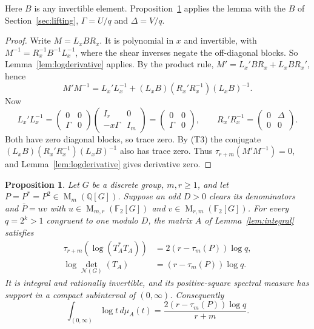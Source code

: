 \documentclass[11pt]{article}
\newtheorem{proposition}[theorem]{Proposition}
\theoremstyle{remark}
\numberwithin{equation}{section}
\newcommand{\F}{\mathbb F}
\newcommand{\Q}{\mathbb Q}
\newcommand{\Mat}{\operatorname{M}}
\newcommand{\N}{\mathcal N}
\begin{document}
Here $B$ is any invertible element. Proposition~\ref{prop:criterion} applies the lemma with the $B$ of Section~\ref{sec:lifting}, $\Gamma=U/q$ and $\Delta=V/q$.

\begin{proof}
Write $M=L_xBR_x$. It is polynomial in $x$ and invertible, with $M^{-1}=R_x^{-1}B^{-1}L_x^{-1}$, where the shear inverses negate the off-diagonal blocks. So Lemma~\ref{lem:logderivative} applies. By the product rule, $M'=L_x'BR_x+L_xBR_x'$, hence
\[
 M'M^{-1}=L_x'L_x^{-1}
 +(L_xB)(R_x'R_x^{-1})(L_xB)^{-1}.
\]
Now
\[
 L_x'L_x^{-1}=\begin{pmatrix}0&0\\\Gamma&0\end{pmatrix}
 \begin{pmatrix}I_r&0\\-x\Gamma&I_m\end{pmatrix}
 =\begin{pmatrix}0&0\\\Gamma&0\end{pmatrix},\qquad
 R_x'R_x^{-1}=\begin{pmatrix}0&\Delta\\0&0\end{pmatrix}.
\]
Both have zero diagonal blocks, so trace zero. By (T3) the conjugate $(L_xB)(R_x'R_x^{-1})(L_xB)^{-1}$ also has trace zero. Thus $\tau_{r+m}(M'M^{-1})=0$, and Lemma~\ref{lem:logderivative} gives derivative zero.
\end{proof}

\begin{proposition}\label{prop:criterion}
Let $G$ be a discrete group, $m,r\ge1$, and let
$P=P^*=P^2\in\Mat_m(\Q[G])$. Suppose an odd $D>0$ clears its
denominators and $\bar P=uv$ with
$u\in\Mat_{m,r}(\F_2[G])$ and
$v\in\Mat_{r,m}(\F_2[G])$. For every $q=2^k>1$ congruent to one
modulo $D$, the matrix $A$ of Lemma~\ref{lem:integral} satisfies
\begin{align}
 \tau_{r+m}(\log(T_A^*T_A))
   &=2(r-\tau_m(P))\log q,\label{eq:criterion-trace}\\
 \log\det_{\N(G)}(T_A)&=(r-\tau_m(P))\log q.
 \label{eq:criterion-det}
\end{align}
It is integral and rationally invertible, and its positive-square
spectral measure has support in a compact subinterval of $(0,\infty)$. Consequently
\begin{equation}\label{eq:criterion-integral}
 \int_{(0,\infty)}\log t\,d\mu_A(t)
 =\frac{2(r-\tau_m(P))\log q}{r+m}.
\end{equation}
\end{proposition}
\end{document}
